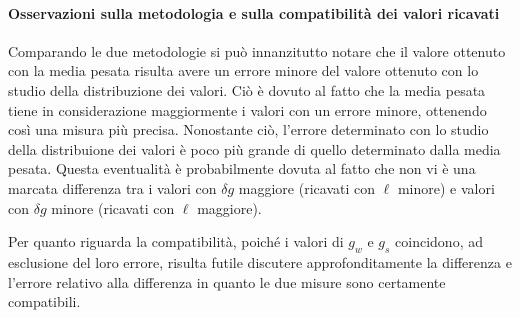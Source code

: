 \paragraph{Osservazioni sulla metodologia e sulla compatibilità dei valori ricavati\\}

Comparando le due metodologie si può innanzitutto notare che il valore ottenuto con la media pesata risulta avere un errore minore del valore ottenuto con lo studio della distribuzione dei valori. Ciò è dovuto al fatto che la media pesata tiene in considerazione maggiormente i valori con un errore minore, ottenendo così una misura più precisa. Nonostante ciò, l'errore determinato con lo studio della distribuione dei valori è poco più grande di quello determinato dalla media pesata. Questa eventualità è probabilmente dovuta al fatto che non vi è una marcata differenza tra i valori con $\delta g$ maggiore (ricavati con $\ell$ minore) e valori con $\delta g$ minore (ricavati con $\ell$ maggiore).

Per quanto riguarda la compatibilità, poiché i valori di $g_w$ e $g_s$ coincidono, ad esclusione del loro errore, risulta futile discutere approfonditamente la differenza e l'errore relativo alla differenza in quanto le due misure sono certamente compatibili.
